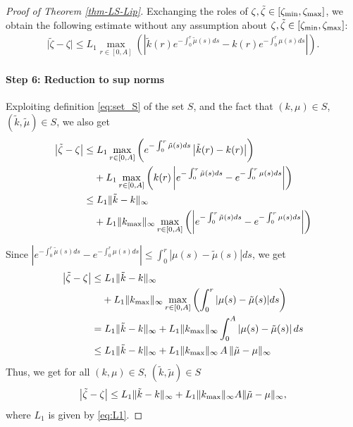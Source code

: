 \documentclass[journal,twoside,web]{ieeecolor}
\begin{document}
\begin{proof}[Proof of Theorem \ref{thm-LS-Lip}]
Exchanging the roles of $\zeta,\tilde{\zeta} \in [\zeta_{\rm min},\zeta_{\rm max}]$, we obtain the following estimate without any assumption about $\zeta,\tilde{\zeta} \in [\zeta_{\rm min},\zeta_{\rm max}]$:
\begin{align}
\big|\tilde{\zeta}-\zeta\big|\leq L_1 \max_{r\in[0,A]} \left( \left|\tilde{k}(r)e^{-\int_0^r \tilde{\mu}(s)ds} - k(r)e^{-\int_0^r \mu(s) ds} \right| \right).
\end{align}

\paragraph*{Step 6: Reduction to sup norms}
Exploiting definition \eqref{eq:set_S} of the set $S$, and the fact that $(k,\mu)\in S$, $(\tilde{k},\tilde{\mu})\in S$, we also get
\begin{align}
\left|\tilde{\zeta}-\zeta\right| 
\leq&\; L_1 \max_{r\in[0,A]} \left( e^{-\int_0^r \tilde{\mu}(s)ds} \left|\tilde{k}(r)-k(r)\right| \right) 
\nonumber \\ &+ L_1 \max_{r\in[0,A]} \left(k(r) \left| e^{-\int_0^r \tilde{\mu}(s)ds} - e^{-\int_0^r \mu(s) ds} \right| \right) \notag \\
\leq&\; L_1 \|\tilde{k}-k\|_\infty \nonumber \\ &+ L_1 \|k_{\rm max}\|_\infty \max_{r\in[0,A]}
\left (\left| e^{-\int_0^r \tilde{\mu}(s)ds} - e^{-\int_0^r \mu(s)ds}\right| \right)
\end{align}


Since $\left|e^{-\int_0^r \tilde{\mu}(s)ds} - e^{-\int_0^r \mu(s) ds}\right| \leq \int_0^r |\mu(s)-\tilde{\mu}(s)| ds$, we get
\begin{align}
\left|\tilde{\zeta}-\zeta\right|
\leq&\; L_1 \|\tilde{k}-k\|_\infty\nonumber \\ & + L_1 \|k_{\rm max}\|_\infty \max_{r\in[0,A]} \left (\int_0^r |\mu(s)-\tilde{\mu}(s)| ds \right) \notag \\
=&\; L_1 \|\tilde{k}-k\|_\infty + L_1 \|k_{\rm max}\|_\infty \int_0^A |\mu(s)-\tilde{\mu}(s)|\, ds \notag \\
\leq&\; L_1 \|\tilde{k}-k\|_\infty + L_1 \|k_{\rm max}\|_\infty\, A\, \|\tilde{\mu}-\mu\|_\infty
\end{align}
Thus, we get for all $(k,\mu)\in S$, $(\tilde{k},\tilde{\mu})\in S$
\begin{align}
\left|\tilde{\zeta}-\zeta \right|
\leq L_1 \|\tilde{k}-k\|_\infty + L_1 \|k_{\rm max}\|_\infty A \|\tilde{\mu}-\mu\|_\infty,
\end{align}
where $L_1$ is given by \eqref{eq:L1}.
\end{proof}
\end{document}
